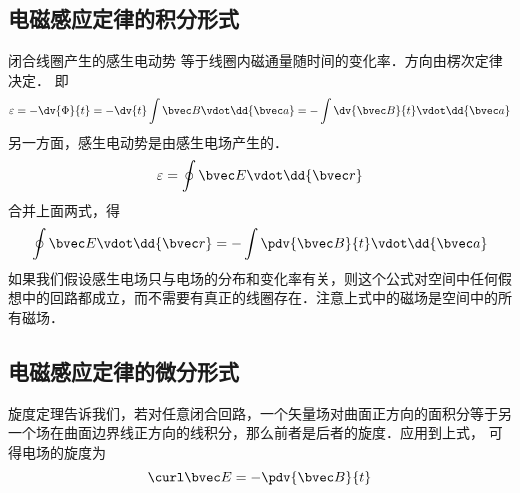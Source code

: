 

\subsection{电磁感应定律的积分形式}

闭合线圈产生的感生电动势%
等于线圈内磁通量随时间的变化率．方向由楞次定律%
决定． 即
\begin{equation}
\varepsilon  =  -\dv{\Phi}{t} =  - \dv{t} \int \bvec B \vdot \dd{\bvec a} =  - \int \dv{\bvec B}{t} \vdot \dd{\bvec a}
\end{equation} 
另一方面，感生电动势是由感生电场产生的． 
\begin{equation}
\varepsilon  = \oint \bvec E \vdot \dd{\bvec r}
\end{equation} 
合并上面两式，得
\begin{equation}
\oint \bvec E \vdot \dd{\bvec r}  =  - \int \pdv{\bvec B}{t} \vdot \dd{\bvec a} 
\end{equation} 
如果我们假设感生电场只与电场的分布和变化率有关，则这个公式对空间中任何假想中的回路都成立，而不需要有真正的线圈存在．注意上式中的磁场是空间中的所有磁场．

\subsection{电磁感应定律的微分形式}

旋度定理告诉我们，若对任意闭合回路，一个矢量场对曲面正方向的面积分等于另一个场在曲面边界线正方向的线积分，那么前者是后者的旋度．应用到上式， 可得电场的旋度为
\begin{equation}
\curl \bvec E =  - \pdv{\bvec B}{t}
\end{equation} 

